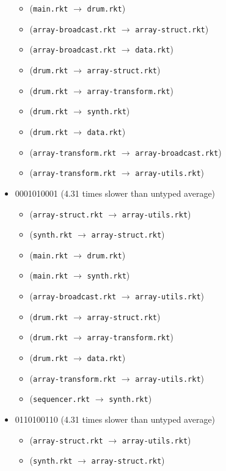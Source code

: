 \documentclass{article}
\newcommand{\mono}[1]{\texttt{#1}}
\begin{document}
\begin{itemize}
\begin{itemize}
  \item (\mono{main.rkt} $\rightarrow$ \mono{drum.rkt})
  \item (\mono{array-broadcast.rkt} $\rightarrow$ \mono{array-struct.rkt})
  \item (\mono{array-broadcast.rkt} $\rightarrow$ \mono{data.rkt})
  \item (\mono{drum.rkt} $\rightarrow$ \mono{array-struct.rkt})
  \item (\mono{drum.rkt} $\rightarrow$ \mono{array-transform.rkt})
  \item (\mono{drum.rkt} $\rightarrow$ \mono{synth.rkt})
  \item (\mono{drum.rkt} $\rightarrow$ \mono{data.rkt})
  \item (\mono{array-transform.rkt} $\rightarrow$ \mono{array-broadcast.rkt})
  \item (\mono{array-transform.rkt} $\rightarrow$ \mono{array-utils.rkt})
  \end{itemize}
\item 0001010001 (4.31 times slower than untyped average)
  \begin{itemize}
  \item (\mono{array-struct.rkt} $\rightarrow$ \mono{array-utils.rkt})
  \item (\mono{synth.rkt} $\rightarrow$ \mono{array-struct.rkt})
  \item (\mono{main.rkt} $\rightarrow$ \mono{drum.rkt})
  \item (\mono{main.rkt} $\rightarrow$ \mono{synth.rkt})
  \item (\mono{array-broadcast.rkt} $\rightarrow$ \mono{array-utils.rkt})
  \item (\mono{drum.rkt} $\rightarrow$ \mono{array-struct.rkt})
  \item (\mono{drum.rkt} $\rightarrow$ \mono{array-transform.rkt})
  \item (\mono{drum.rkt} $\rightarrow$ \mono{data.rkt})
  \item (\mono{array-transform.rkt} $\rightarrow$ \mono{array-utils.rkt})
  \item (\mono{sequencer.rkt} $\rightarrow$ \mono{synth.rkt})
  \end{itemize}
\item 0110100110 (4.31 times slower than untyped average)
  \begin{itemize}
  \item (\mono{array-struct.rkt} $\rightarrow$ \mono{array-utils.rkt})
  \item (\mono{synth.rkt} $\rightarrow$ \mono{array-struct.rkt})

\end{itemize}
\end{itemize}
\end{document}
